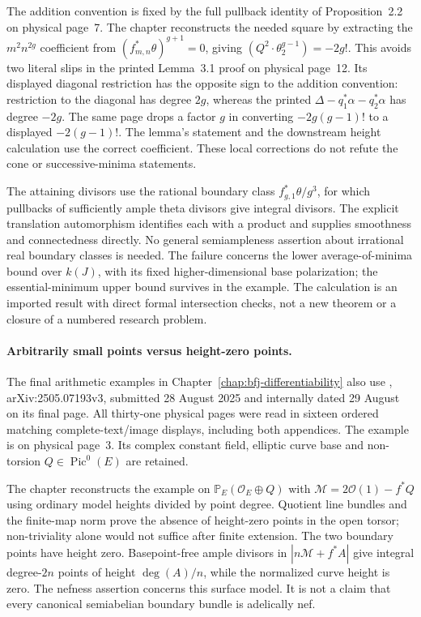 The addition convention is fixed by the full pullback identity of
Proposition~2.2 on physical page~7. The chapter reconstructs the
needed square by extracting the $m^2n^{2g}$ coefficient from
$(f_{m,n}^*\theta)^{g+1}=0$, giving
$(Q^2\cdot\theta_2^{g-1})=-2g!$.
This avoids two literal slips in the printed Lemma~3.1 proof on
physical page~12. Its displayed diagonal restriction has the
opposite sign to the addition convention: restriction to the
diagonal has degree $2g$, whereas the printed
$\Delta-q_1^*\alpha-q_2^*\alpha$ has degree $-2g$.
The same page drops a factor $g$ in converting
$-2g(g-1)!$ to a displayed $-2(g-1)!$.
The lemma's statement and the downstream height calculation use
the correct coefficient. These local corrections do not refute
the cone or successive-minima statements.

The attaining divisors use the rational boundary class
$f_{g,1}^*\theta/g^3$, for which pullbacks of sufficiently ample
theta divisors give integral divisors. The explicit translation
automorphism identifies each with a product and supplies smoothness
and connectedness directly. No general semiampleness assertion
about irrational real boundary classes is needed.
The failure concerns the lower average-of-minima bound over
$k(J)$, with its fixed higher-dimensional base polarization;
the essential-minimum upper bound survives in the example.
The calculation is an imported result with direct formal
intersection checks, not a new theorem or a closure of a numbered
research problem.

\paragraph{Arbitrarily small points versus height-zero points.}

The final arithmetic examples in Chapter~\ref{chap:bfj-differentiability}
also use \cite[Example~1.2]{LY25SemiabelianV3}, arXiv:2505.07193v3,
submitted 28 August 2025 and internally dated 29 August on its final page.
All thirty-one physical pages were read in sixteen ordered matching
complete-text/image displays, including both appendices.  The example is
on physical page~3.  Its complex constant field, elliptic curve base and
non-torsion $Q\in\operatorname{Pic}^0(E)$ are retained.

The chapter reconstructs the example on
$\mathbb P_E(\mathcal O_E\oplus Q)$ with
$\mathcal M=2\mathcal O(1)-f^*Q$ using ordinary model heights divided
by point degree.  Quotient line bundles and the finite-map norm prove
the absence of height-zero points in the open torsor; non-triviality
alone would not suffice after finite extension.  The two boundary points
have height zero.  Basepoint-free ample divisors in
$|n\mathcal M+f^*A|$ give integral degree-$2n$ points of height
$\deg(A)/n$, while the normalized curve height is zero.
The nefness assertion concerns this surface model.  It is not a claim
that every canonical semiabelian boundary bundle is adelically nef.

